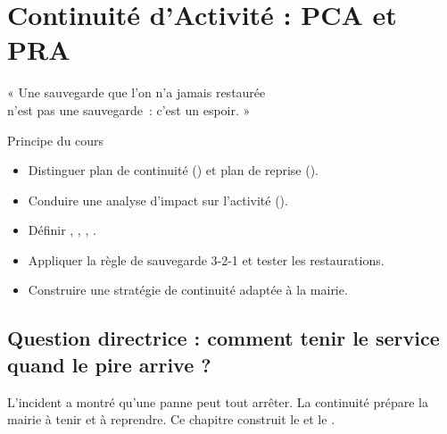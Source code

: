 
\chapter{Continuité d'Activité : PCA et PRA}
\label{chap:continuite}

\epigraph{%
    « Une sauvegarde que l'on n'a jamais restaurée\\
    n'est pas une sauvegarde~: c'est un espoir. »%
}{Principe du cours}


\begin{boxobjectifs}
\begin{itemize}
    \item Distinguer plan de continuité () et plan de reprise
          ().
    \item Conduire une analyse d'impact sur l'activité ().
    \item Définir , , , .
    \item Appliquer la règle de sauvegarde \mbox{3-2-1} et tester les
          restaurations.
    \item Construire une stratégie de continuité adaptée à la mairie.
\end{itemize}
\end{boxobjectifs}

\bigskip

\section*{Question directrice : comment tenir le service quand le pire arrive ?}

L'incident a montré qu'une panne peut tout arrêter. La continuité prépare la
mairie à tenir et à reprendre. Ce chapitre construit le  et le
.

